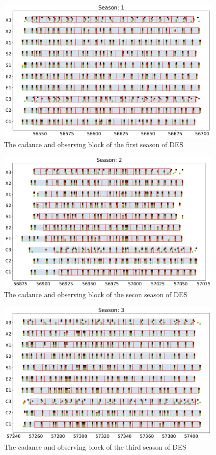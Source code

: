 \begin{figure}[h]
  \includegraphics[width=\textwidth]{Figures/Chapter5/ObsBlock_Season1.pdf}
  \caption{The cadance and observing block of the first season of DES}
  \label{fig:ObsBlock1}
\end{figure}

\begin{figure}[h]
  \includegraphics[width=\textwidth]{Figures/Chapter5/ObsBlock_Season2.pdf}
  \caption{The cadance and observing block of the secon season of DES}
  \label{fig:ObsBlock2}
\end{figure}

\begin{figure}[h]
\includegraphics[width=\textwidth]{Figures/Chapter5/ObsBlock_Season3.pdf}
  \caption{The cadance and observing block of the third season of DES}
  \label{fig:ObsBlock3}
\end{figure}

